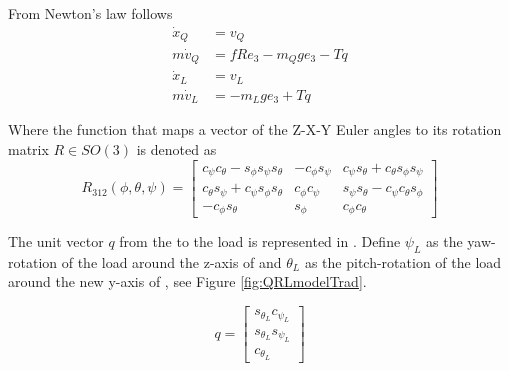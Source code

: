 From Newton's law follows
\begin{equation}\label{eq:newton}
\begin{aligned}
\dot{x}_Q &= v_Q\\
m\dot{v}_Q &=fRe_3-m_Qge_3-Tq\\
\dot{x}_L &= v_L\\
m\dot{v}_L &=-m_Lge_3+Tq
\end{aligned}
\end{equation}

Where the function that maps a vector of the Z-X-Y Euler angles to its rotation matrix $ R\in SO(3) $ is denoted as \cite{Mahony2012}
\begin{equation}\label{key}
R_{312}({\phi},{\theta},{\psi})=\begin{bmatrix}
c_{\psi}c_{\theta}-s_{\phi}s_{\psi}s_{\theta}&-c_{\phi}s_{\psi}&c_{\psi}s_{\theta}+c_{\theta}s_{\phi}s_{\psi}\\
c_{\theta}s_{\psi}+c_{\psi}s_{\phi}s_{\theta}&c_{\phi}c_{\psi}&s_{\psi}s_{\theta}-c_{\psi}c_{\theta}s_{\phi}\\
-c_{\phi}s_{\theta}&s_{\phi}&c_{\phi}c_{\theta}
\end{bmatrix}
\end{equation}

The unit vector $ q $ from the  to the load is represented in \BF. Define $ \psi_L $ as the yaw-rotation of the load around the z-axis of \BF and $ \theta_L $ as the pitch-rotation of the load around the new y-axis of \BF, see Figure \ref{fig:QRLmodelTrad}.

\begin{equation}\label{key}
q=\begin{bmatrix}
s_{\theta_L}c_{\psi_L}\\
s_{\theta_L}s_{\psi_L}\\
c_{\theta_L}
\end{bmatrix}
\end{equation} 

